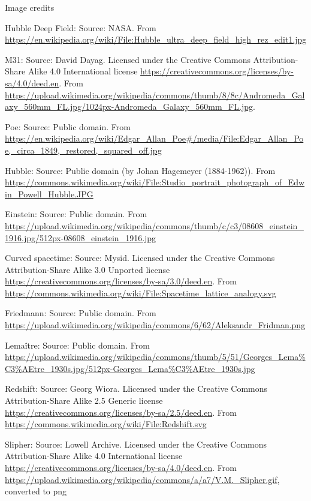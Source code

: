 \documentclass[usenames,dvipsnames,12pt,compress]{beamer}
\begin{document}
\begin{frame}{Image credits}
  \begin{block}{}
  \begin{enumerate}
  \tiny {
  \item{Hubble Deep Field: Source: NASA. From \url{https://en.wikipedia.org/wiki/File:Hubble_ultra_deep_field_high_rez_edit1.jpg}}
  \item{M31: Source: David Dayag. Licensed under the Creative Commons Attribution-Share Alike 4.0 International license \url{https://creativecommons.org/licenses/by-sa/4.0/deed.en}. From \url{https://upload.wikimedia.org/wikipedia/commons/thumb/8/8c/Andromeda_Galaxy_560mm_FL.jpg/1024px-Andromeda_Galaxy_560mm_FL.jpg}.}
  \item{Poe: Source: Public domain. From \url{https://en.wikipedia.org/wiki/Edgar_Allan_Poe\#/media/File:Edgar_Allan_Poe,_circa_1849,_restored,_squared_off.jpg}}
  \item{Hubble: Source: Public domain (by Johan Hagemeyer (1884-1962)). From \url{https://commons.wikimedia.org/wiki/File:Studio_portrait_photograph_of_Edwin_Powell_Hubble.JPG}}
  \item{Einstein: Source: Public domain. From \url{https://upload.wikimedia.org/wikipedia/commons/thumb/c/c3/08608_einstein_1916.jpg/512px-08608_einstein_1916.jpg}}
  \item{Curved spacetime: Source: Mysid. Licensed under the Creative Commons Attribution-Share Alike 3.0 Unported license \url{https://creativecommons.org/licenses/by-sa/3.0/deed.en}. From \url{https://commons.wikimedia.org/wiki/File:Spacetime_lattice_analogy.svg}}
  \item{Friedmann: Source: Public domain. From \url{https://upload.wikimedia.org/wikipedia/commons/6/62/Aleksandr_Fridman.png}}
  \item{Lema\^itre: Source: Public domain. From \url{https://upload.wikimedia.org/wikipedia/commons/thumb/5/51/Georges_Lema\%C3\%AEtre_1930s.jpg/512px-Georges_Lema\%C3\%AEtre_1930s.jpg}}  
  \item{Redshift: Source: Georg Wiora. Llicensed under the Creative Commons Attribution-Share Alike 2.5 Generic license \url{https://creativecommons.org/licenses/by-sa/2.5/deed.en}. From \url{https://commons.wikimedia.org/wiki/File:Redshift.svg}}
  \item{Slipher: Source: Lowell Archive. Licensed under the Creative Commons Attribution-Share Alike 4.0 International license \url{https://creativecommons.org/licenses/by-sa/4.0/deed.en}. From \url{https://upload.wikimedia.org/wikipedia/commons/a/a7/V.M._Slipher.gif}, converted to png}  
  } %
  \end{enumerate}
  \end{block}
\end{frame}
\end{document}
